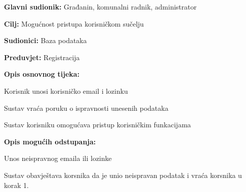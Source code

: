					
					\noindent {}
					\begin{packed_item}
	
						\item \textbf{Glavni sudionik: } Građanin, komunalni radnik, administrator
						\item  \textbf{Cilj:} Mogućnost pristupa korisničkom sučelju
						\item  \textbf{Sudionici:} Baza podataka
						\item  \textbf{Preduvjet:} Registracija
						\item  \textbf{Opis osnovnog tijeka:}
						
						\item[] \begin{packed_enum}
	
							\item Korisnik unosi korisničko email i lozinku
							\item Sustav vraća poruku o ispravnosti unesenih podataka
							\item Sustav korisniku omogućava pristup korisničkim funkacijama 
						\end{packed_enum}
						
						\item  \textbf{Opis mogućih odstupanja:}
						
						\item[] \begin{packed_item}
	
							\item[2.a] Unos neispravnog emaila ili lozinke
							
							\item[] \begin{packed_enum}
								
								\item Sustav obavještava korsnika da je unio neispravan podatak i vraća korsnika u korak 1.
								
							\end{packed_enum}
													
						\end{packed_item}
					\end{packed_item}


